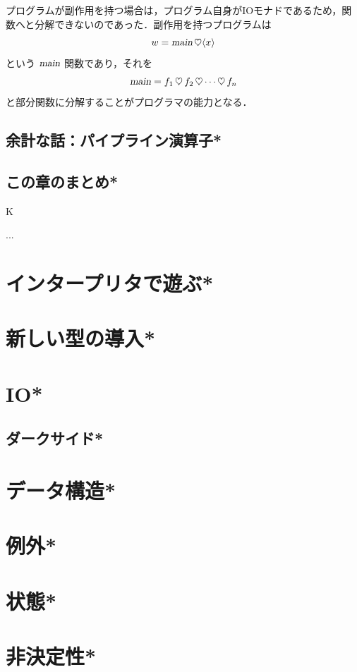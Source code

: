 \documentclass[a4paper,twocolumn]{jsbook}
\newenvironment{note}[1]{\begin{boxnote}\begin{center}#1\end{center}}{\end{boxnote}}
\newcommand{\mAction}[1]{\textsl{#1}}
\DeclareMathOperator{\mMain}{\mAction{main}}
\DeclareMathOperator{\mBind}{\heartsuit}
\newcommand{\mPureWith}[1]{\langle#1\rangle}
\begin{document}
プログラムが副作用を持つ場合は，プログラム自身がIOモナドであるため，関数へと分解できないのであった．副作用を持つプログラムは
\begin{equation}
w=\mMain\mBind\mPureWith{x}
\end{equation}
という $\mMain$ 関数であり，それを
\begin{equation}
\mMain=f_1\mBind f_2\mBind\dotsb\mBind f_n  %
\end{equation}
と部分関数に分解することがプログラマの能力となる．


\section{余計な話：パイプライン演算子*}
\section{この章のまとめ*}

\begin{note}{K}
...
\end{note}


\chapter{インタープリタで遊ぶ*}
\chapter{新しい型の導入*}

\chapter{IO*}
\section{ダークサイド*}
\chapter{データ構造*}
\chapter{例外*}
\chapter{状態*}
\chapter{非決定性*}
\end{document}
